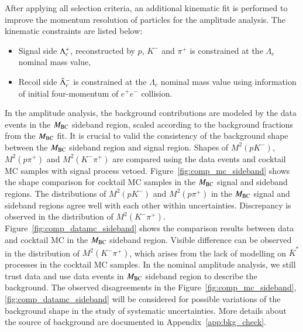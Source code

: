 After applying all selection criteria, an additional kinematic fit is performed to improve the momentum resolution of particles for the amplitude analysis. The kinematic constraints are listed below:
\begin{itemize}
    \item Signal side $\Lambda_{c}^{+}$, reconstructed by $p$, $K^-$ and $\pi^+$ is constrained at the $\Lambda_c$ nominal mass value,
    \item Recoil side $\bar{\Lambda}_{c}^{-}$ is constrained at the $\Lambda_c$ nominal mass value using information of initial four-momentum of $e^+e^-$ collision.
\end{itemize}

In the amplitude analysis, the background contributions are modeled by the data events in the $M_{\rm{BC}}$ sideband region, scaled according to the background fractions from the $M_{\rm{BC}}$ fit. It is crucial to valid the consistency of the background shape between the $M_{\rm{BC}}$ sideband region and signal region. Shapes of $M^2(pK^-)$, $M^2(p\pi^+)$ and $M^2(K^-\pi^+)$ are compared using the data events and cocktail MC samples with signal process vetoed. Figure~\ref{fig:comp_mc_sideband} shows the shape comparison for cocktail MC samples in the $M_{\rm{BC}}$ signal and sideband regions. The distributions of $M^2(pK^-)$ and $M^2(p\pi^+)$ in the $M_{\rm{BC}}$ signal and sideband regions agree well with each other within uncertainties. Discrepancy is observed in the distribution of $M^2(K^-\pi^+)$. 
Figure~\ref{fig:comp_datamc_sideband} shows the comparison results between data and cocktail MC in the $M_{\rm{BC}}$ sideband region. Visible difference can be observed in the distribution of $M^2(K^-\pi^+)$, which arises from the lack of modelling on $\bar{K}^*$ processes in the cocktail MC samples. In the nominal amplitude analysis, we still trust data and use data events in $M_{\rm{BC}}$ sideband region to describe the background. The observed disagreements in the Figure~\ref{fig:comp_mc_sideband}, \ref{fig:comp_datamc_sideband} will be considered for possible variations of the background shape in the study of systematic uncertainties. More details about the source of background are documented in Appendix~\ref{app:bkg_check}.


